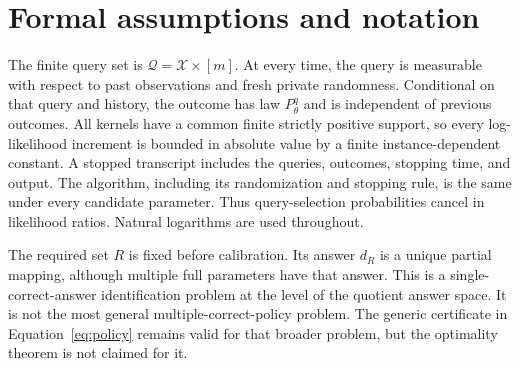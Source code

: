 \section{Formal assumptions and notation}
The finite query set is $\mathcal Q=\mathcal X\times[m]$. At every time, the query is measurable with respect to past observations and fresh private randomness. Conditional on that query and history, the outcome has law $P_\theta^q$ and is independent of previous outcomes. All kernels have a common finite strictly positive support, so every log-likelihood increment is bounded in absolute value by a finite instance-dependent constant. A stopped transcript includes the queries, outcomes, stopping time, and output. The algorithm, including its randomization and stopping rule, is the same under every candidate parameter. Thus query-selection probabilities cancel in likelihood ratios. Natural logarithms are used throughout.

The required set $R$ is fixed before calibration. Its answer $d_R$ is a unique partial mapping, although multiple full parameters have that answer. This is a single-correct-answer identification problem at the level of the quotient answer space. It is not the most general multiple-correct-policy problem. The generic certificate in Equation~\eqref{eq:policy} remains valid for that broader problem, but the optimality theorem is not claimed for it.

